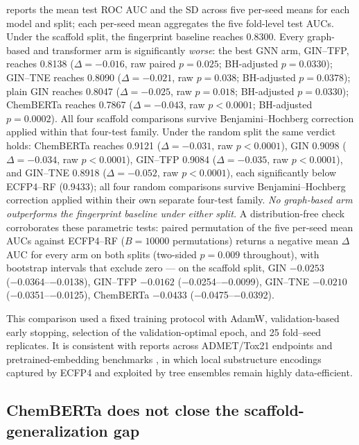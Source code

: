\documentclass[11pt,a4paper]{article}
\begin{document}
 reports the mean test ROC AUC and the SD across five per-seed means for each model and split; each per-seed mean aggregates the five fold-level test AUCs. Under the scaffold split, the fingerprint baseline reaches \num{0.8300}. Every graph-based and transformer arm is significantly \emph{worse}: the best GNN arm, GIN--TFP, reaches \num{0.8138} ($\Delta = -\num{0.016}$, raw paired $p = \num{0.025}$; BH-adjusted $p = \num{0.0330}$); GIN--TNE reaches \num{0.8090} ($\Delta = -\num{0.021}$, raw $p = \num{0.038}$; BH-adjusted $p = \num{0.0378}$); plain GIN reaches \num{0.8047} ($\Delta = -\num{0.025}$, raw $p = \num{0.018}$; BH-adjusted $p = \num{0.0330}$); ChemBERTa reaches \num{0.7867} ($\Delta = -\num{0.043}$, raw $p < \num{0.0001}$; BH-adjusted $p = \num{0.0002}$). All four scaffold comparisons survive Benjamini--Hochberg correction applied within that four-test family. Under the random split the same verdict holds: ChemBERTa reaches \num{0.9121} ($\Delta = -\num{0.031}$, raw $p < \num{0.0001}$), GIN \num{0.9098} ($\Delta = -\num{0.034}$, raw $p < \num{0.0001}$), GIN--TFP \num{0.9084} ($\Delta = -\num{0.035}$, raw $p < \num{0.0001}$), and GIN--TNE \num{0.8918} ($\Delta = -\num{0.052}$, raw $p < \num{0.0001}$), each significantly below ECFP4--RF (\num{0.9433}); all four random comparisons survive Benjamini--Hochberg correction applied within their own separate four-test family. \emph{No graph-based arm outperforms the fingerprint baseline under either split.}
A distribution-free check corroborates these parametric tests: paired permutation of the five per-seed mean AUCs against ECFP4--RF ($B=\num{10000}$ permutations) returns a negative mean $\Delta$AUC for every arm on both splits (two-sided $p=\num{0.009}$ throughout), with bootstrap intervals that exclude zero --- on the scaffold split, GIN $-\num{0.0253}$ (\numrange{-0.0364}{-0.0138}), GIN--TFP $-\num{0.0162}$ (\numrange{-0.0254}{-0.0099}), GIN--TNE $-\num{0.0210}$ (\numrange{-0.0351}{-0.0125}), ChemBERTa $-\num{0.0433}$ (\numrange{-0.0475}{-0.0392}).

This comparison used a fixed training protocol with AdamW, validation-based early stopping, selection of the validation-optimal epoch, and \num{25} fold--seed replicates. It is consistent with reports across ADMET/Tox21 endpoints \citep{guo_ding_2026} and pretrained-embedding benchmarks \citep{benchmark_pretrained_2025}, in which local substructure encodings captured by ECFP4 and exploited by tree ensembles remain highly data-efficient.

\subsection{ChemBERTa does not close the scaffold-generalization gap}
\end{document}
